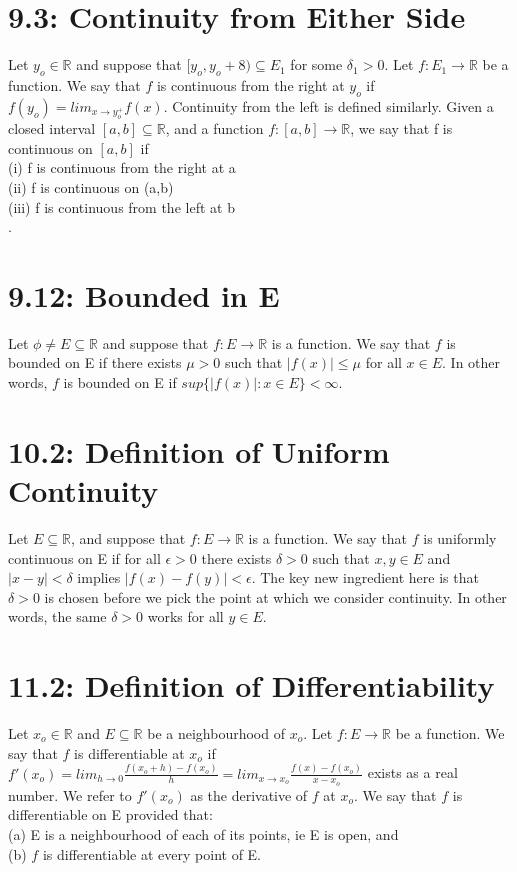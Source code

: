 \documentclass[10pt,letter]{report}
\begin{document}
\section*{9.3: Continuity from Either Side}
Let $y_o\in\mathbb{R}$ and suppose that $[y_o,y_o+8)\subseteq E_1$ for some $\delta_1>0$. Let $f: E_1\rightarrow\mathbb{R}$ be a function. We say that $f$ is continuous from the right at $y_o$ if $f(y_o) = lim_{x\rightarrow y_o^+}f(x)$. Continuity from the left is defined similarly. Given a closed interval $[a,b]\subseteq\mathbb{R}$, and a function $f:[a,b]\rightarrow\mathbb{R}$, we say that f is continuous on $[a,b]$ if \\ 
(i) f is continuous from the right at a\\ 
(ii) f is continuous on (a,b) \\ 
(iii) f is continuous from the left at b\\.

\section*{9.12: Bounded in E}
Let $\phi\neq E\subseteq\mathbb{R}$ and suppose that $f:E\rightarrow\mathbb{R}$ is a function. We say that $f$ is bounded on E if there exists $\mu>0$ such that $|f(x)|\leq\mu$ for all $x\in E$. In other words, $f$ is bounded on E if $sup\{|f(x)|:x\in E\}<\infty$. 

\section*{10.2: Definition of Uniform Continuity}
Let $E\subseteq\mathbb{R}$, and suppose that $f:E\rightarrow\mathbb{R}$ is a function. We say that $f$ is uniformly continuous on E if for all $\epsilon>0$ there exists $\delta>0$ such that $x,y\in E$ and $|x-y|<\delta$ implies $|f(x)-f(y)|<\epsilon$. The key new ingredient here is that $\delta>0$ is chosen before we pick the point at which we consider continuity. In other words, the same $\delta>0$ works for all $y\in E$. 

\section*{11.2: Definition of Differentiability}
Let $x_o\in\mathbb{R}$ and $E\subseteq\mathbb{R}$ be a neighbourhood of $x_o$. Let $f:E\rightarrow\mathbb{R}$ be a function. We say that $f$ is differentiable at $x_o$ if $f'(x_o)=lim_{h\rightarrow0}\frac{f(x_o+h)-f(x_o)}{h}=lim_{x\rightarrow x_o}\frac{f(x)-f(x_o)}{x-x_o}$ exists as a real number. We refer to $f'(x_o)$ as the derivative of $f$ at $x_o$. We say that $f$ is differentiable on E provided that: \\ 
(a) E is a neighbourhood of each of its points, ie E is open, and \\ 
(b) $f$ is differentiable at every point of E. 
\end{document}
